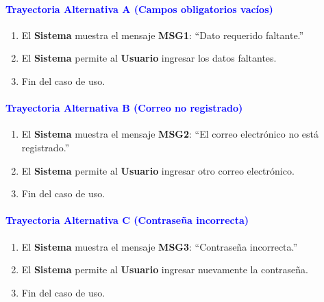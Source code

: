 \paragraph{\textbf{\textcolor{blue}{Trayectoria Alternativa A (Campos obligatorios vacíos)}}}
\begin{enumerate}
    \item El \textbf{Sistema} muestra el mensaje \textbf{MSG1}: ``Dato requerido faltante.''
    \item El \textbf{Sistema} permite al \textbf{Usuario} ingresar los datos faltantes.
    \item Fin del caso de uso.
\end{enumerate}

\paragraph{\textbf{\textcolor{blue}{Trayectoria Alternativa B (Correo no registrado)}}}
\begin{enumerate}
    \item El \textbf{Sistema} muestra el mensaje \textbf{MSG2}: ``El correo electrónico no está registrado.''
    \item El \textbf{Sistema} permite al \textbf{Usuario} ingresar otro correo electrónico.
    \item Fin del caso de uso.
\end{enumerate}

\paragraph{\textbf{\textcolor{blue}{Trayectoria Alternativa C (Contraseña incorrecta)}}}
\begin{enumerate}
    \item El \textbf{Sistema} muestra el mensaje \textbf{MSG3}: ``Contraseña incorrecta.''
    \item El \textbf{Sistema} permite al \textbf{Usuario} ingresar nuevamente la contraseña.
    \item Fin del caso de uso.
\end{enumerate}

